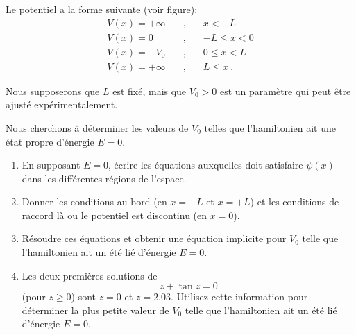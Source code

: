 Le potentiel a
la forme suivante (voir figure):
\begin{eqnarray}
V(x)=+\infty &\quad , \quad& x<-L\nonumber\\
V(x)=0 &\quad , \quad& -L\leq x < 0 \nonumber\\
V(x)=-V_0 &\quad , \quad& 0 \leq x < L \nonumber\\
V(x)=+\infty &\quad , \quad& L\leq x \ .
\end{eqnarray}

Nous supposerons que $L$ est fixé, mais que $V_0>0$ est un paramètre qui peut être ajusté expérimentalement.

Nous cherchons à déterminer les valeurs de $V_0$ telles que l'hamiltonien ait une état propre d'énergie $E=0$.

\newpage

\begin{enumerate}
\item
En supposant $E=0$, écrire les équations auxquelles doit satisfaire $\psi(x)$ dans les différentes régions de l'espace.

\item
Donner les conditions au bord (en $x=-L$ et $x=+L$) et les conditions de raccord là ou le potentiel est discontinu (en $x=0$).

\item
Résoudre ces équations et obtenir une équation implicite pour $V_0$ telle que l'hamiltonien ait un été lié d'énergie $E=0$.
\item

Les deux premières solutions de $$z+ \tan z =0$$ 
(pour $z\geq 0$) sont
$z=0$ et $z=2.03$. Utilisez cette information pour déterminer la  plus petite valeur de $V_0$ telle que l'hamiltonien ait un été lié d'énergie $E=0$.


\end{enumerate}
